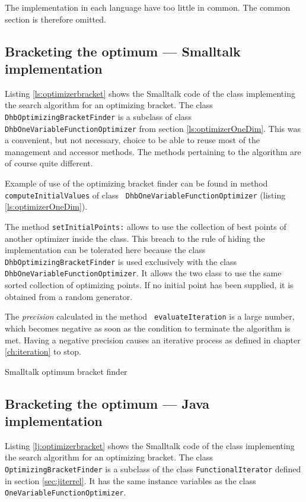 \documentclass[twoside]{book}
\begin{document}
\noindent The implementation in each language have too little in
common. The common section is therefore omitted.

\subsection{Bracketing the optimum --- Smalltalk implementation}
\label{sec:sbracket}  Listing
\ref{ls:optimizerbracket} shows the Smalltalk code of the class
implementing the search algorithm for an optimizing bracket. The
class {\tt DhbOptimizingBracketFinder} is a subclass of class {\tt
DhbOneVariableFunctionOptimizer} from section
\ref{ls:optimizerOneDim}. This was a convenient, but not
necessary, choice to be able to reuse most of the management and
accessor methods. The methods pertaining to the algorithm are of
course quite different.

Example of use of the optimizing bracket finder can be found in
method {\tt computeInitialValues} of class {\tt
DhbOneVariableFunctionOptimizer} (\cf listing
\ref{ls:optimizerOneDim}).

The method {\tt setInitialPoints:} allows to use the collection of
best points of another optimizer inside the class. This breach to
the rule of hiding the implementation can be tolerated here
because the class {\tt DhbOptimizingBracketFinder} is used
exclusively with the class {\tt DhbOneVariableFunctionOptimizer}.
It allows the two class to use the same sorted collection of
optimizing points. If no initial point has been supplied, it is
obtained from a random generator.

The {\sl precision} calculated in the method {\tt
evaluateIteration} is a large number, which becomes negative as
soon as the condition to terminate the algorithm is met. Having a
negative precision causes an iterative process as defined in
chapter \ref{ch:iteration} to stop.

\begin{listing} Smalltalk optimum bracket finder \label{ls:optimizerbracket}

\end{listing}

\subsection{Bracketing the optimum --- Java implementation}
\label{sec:jbracket}  Listing
\ref{lj:optimizerbracket} shows the Smalltalk code of the class
implementing the search algorithm for an optimizing bracket. The
class {\tt OptimizingBracketFinder} is a subclass of the class
{\tt FunctionalIterator} defined in section \ref{sec:jiterrel}. It
has the same instance variables as the class {\tt
OneVariableFunctionOptimizer}.
\end{document}
